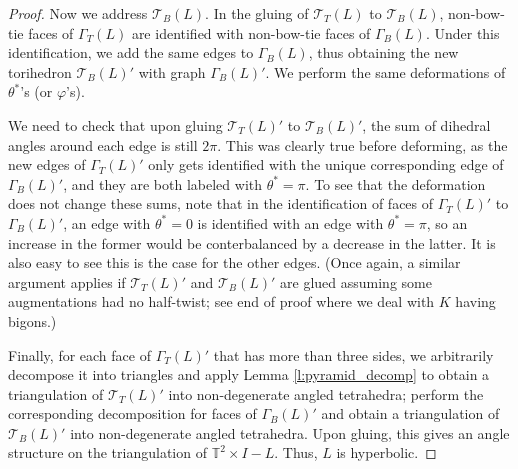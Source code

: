 \documentclass[11pt]{amsart}
\newcommand{\lemref}[1]{Lemma \ref{#1}}
\newcommand{\remref}[1]{Remark \ref{#1}}
\newcommand{\torus}{{\mathbb{T}^2}}
\newcommand{\sT}{{\mathcal{T}}}
\newcommand{\vphi}{\varphi}
\newcommand{\toruscomp}[1]{{\torus \times I - #1}}
\theoremstyle{plain}
\theoremstyle{definition}
\begin{document}
\begin{proof}
Now we address $\sT_B(L)$.
In the gluing of $\sT_T(L)$ to $\sT_B(L)$,
non-bow-tie faces of $\Gamma_T(L)$ are identified with
non-bow-tie faces of $\Gamma_B(L)$.
Under this identification, we add the same edges to $\Gamma_B(L)$,
thus obtaining the new torihedron $\sT_B(L)'$ with graph
$\Gamma_B(L)'$.
We perform the same deformations of $\theta^*$'s (or $\vphi$'s).


We need to check that upon gluing $\sT_T(L)'$ to $\sT_B(L)'$,
the sum of dihedral angles around each edge is still $2\pi$.
This was clearly true before deforming, as the new edges of
$\Gamma_T(L)'$ only gets identified with the unique
corresponding edge of $\Gamma_B(L)'$, and they are both labeled
with $\theta^* = \pi$.
To see that the deformation does not change these sums,
note that in the identification of faces of $\Gamma_T(L)'$
to $\Gamma_B(L)'$,
an edge with $\theta^*=0$ is identified with an edge with
$\theta^*=\pi$,
so an increase in the former would be conterbalanced by
a decrease in the latter.
It is also easy to see this is the case for the other edges.
(Once again, a similar argument applies if $\sT_T(L)'$
and $\sT_B(L)'$ are glued assuming
some augmentations had no half-twist;
see end of proof where we deal with $K$ having bigons.)


Finally, for each face of $\Gamma_T(L)'$ that has more than three sides,
we arbitrarily decompose it into triangles
and apply \lemref{l:pyramid_decomp}
to obtain a triangulation of $\sT_T(L)'$ into non-degenerate angled tetrahedra;
perform the corresponding decomposition for faces of
$\Gamma_B(L)'$ and obtain a triangulation of $\sT_B(L)'$
into non-degenerate angled tetrahedra.
Upon gluing, this gives an angle structure on the triangulation
of $\toruscomp{L}$.
Thus, $L$ is hyperbolic.
\end{proof}




\end{document}
